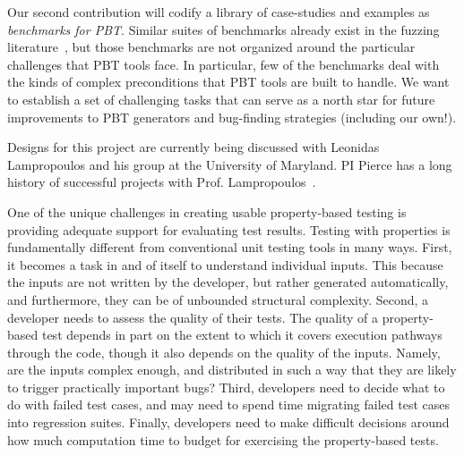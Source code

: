 Our second contribution will codify a library of case-studies and examples as
{\em benchmarks for PBT}. Similar suites of benchmarks already exist in the
fuzzing literature~\cite{hazimeh_magma_2021}, but those benchmarks are not
organized around the particular challenges that PBT tools face. In particular,
few of the benchmarks deal with the kinds of complex preconditions that PBT
tools are built to handle. We want to establish a set of challenging tasks that
can serve as a north star for future improvements to PBT generators and
bug-finding strategies (including our own!).

Designs for this project are currently being discussed with Leonidas
Lampropoulos and his group at the University of Maryland. PI Pierce has a long
history of successful projects with Prof.
Lampropoulos~\cite[etc.]{LuckPOPL,goldstein2021dojudgeatest,lampropoulos_coverage_2019,Lampropoulos&18,OLDlampropoulos19fuzzchick}.
\iflater
{}
\fi


One of the unique challenges in creating usable property-based testing is
providing adequate support for evaluating test results. Testing with properties
is fundamentally different from conventional unit testing tools in many ways.
First, it becomes a task in and of itself to understand individual inputs. This
because the inputs are not written by the developer, but rather generated
automatically, and furthermore, they can be of unbounded structural complexity.
Second, a developer needs to assess the quality of their tests. The quality of a
property-based test depends in part on the extent to which it covers execution
pathways through the code, though it also depends on the quality of the inputs.
Namely, are the inputs complex enough, and distributed in such a way that they
are likely to trigger practically important bugs? Third, developers need to
decide what to do with failed test cases, and may need to spend time migrating
failed test cases into regression suites. Finally, developers need to make
difficult decisions around how much computation time to budget for exercising
the property-based tests.

